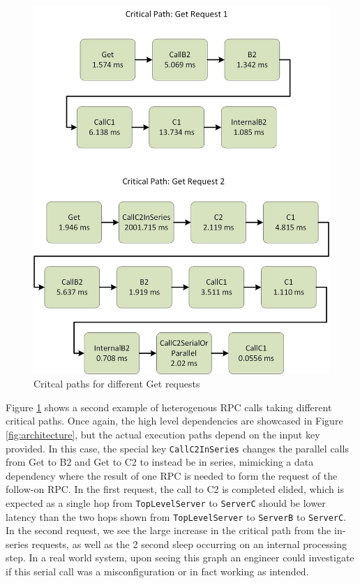\documentclass[11pt, twoside, twocolumn]{extarticle}
\begin{document}
\begin{figure}[h]
\centering
\includegraphics[width=\linewidth]{evaluation2.jpg}
\caption[width=\linewidth]{Critcal paths for different Get requests}
\label{eval_get}
\end{figure}

Figure \ref{eval_get} shows a second example of heterogenous RPC calls taking different critical paths.  Once again, the high level dependencies are showcased in Figure \ref{fig:architecture}, but the actual execution paths depend on the input key provided.  In this case, the special key \lstinline{CallC2InSeries} changes the parallel calls from Get to B2 and Get to C2 to instead be in series, mimicking a data dependency where the result of one RPC is needed to form the request of the follow-on RPC.  In the first request, the call to C2 is completed elided, which is expected as a single hop from \lstinline{TopLevelServer} to \lstinline{ServerC} should be lower latency than the two hops shown from \lstinline{TopLevelServer} to \lstinline{ServerB} to \lstinline{ServerC}.  In the second request, we see the large increase in the critical path from the in-series requests, as well as the 2 second sleep occurring on an internal processing step.  In a real world system, upon seeing this graph an engineer could investigate if this serial call was a misconfiguration or in fact working as intended.
\end{document}
